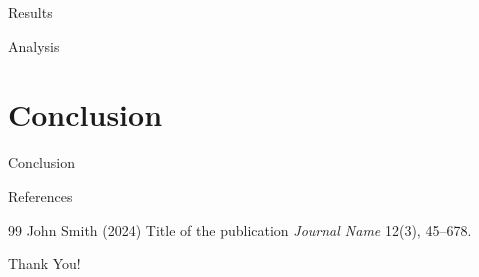 \documentclass[10pt,aspectratio=169]{beamer}
\begin{document}
\begin{frame}{Results}
\lipsum[5][1-5]
\end{frame}

\begin{frame}{Analysis}
\lipsum[6][1-5]
\end{frame}


\section{Conclusion}

\begin{frame}{Conclusion}
\lipsum[7][1-5]
\end{frame}


\begin{frame}[allowframebreaks]{References}
\footnotesize
\begin{thebibliography}{99}
 John Smith (2024)
\newblock Title of the publication
\newblock \emph{Journal Name} 12(3), 45--678.
\end{thebibliography}
\end{frame}


\begin{frame}[standout]
Thank You!
\end{frame}

\end{document}
